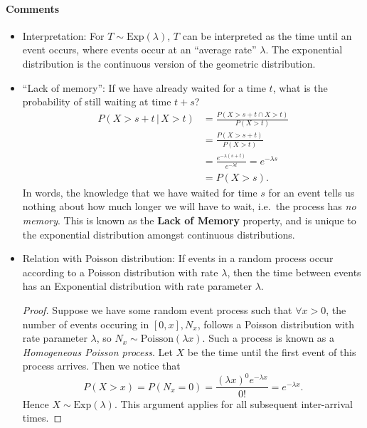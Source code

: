 \documentclass[12pt]{report}
\theoremstyle{definition}
\begin{document}
\paragraph{Comments}
\begin{itemize}
    \item Interpretation: For $T\sim\text{Exp}(\lambda)$, $T$ can be interpreted
        as the time until an event occurs, where events occur at an ``average
        rate'' $\lambda$.
        The exponential distribution is the continuous version of the geometric
        distribution.
    \item ``Lack of memory'': If we have already waited for a time $t$,
        what is the probability of still waiting at time $t+s$?
        \begin{align*}
            P(X>s+t\,|\,X>t)& =\frac{P(X>s+t\cap X>t)}{P(X>t)} \\
                            & =\frac{P(X>s+t)}{P(X>t)} \\
                            & =\frac{e^{-\lambda(s+t)}}{e^{-\lambda t}}
                            =e^{-\lambda s} \\
                            & =P(X>s).
        \end{align*} 
        In words, the knowledge that we have waited for time $s$ for an event
        tells us nothing about how much longer we will have to wait, i.e.\ the
        process has \emph{no memory}.
        This is known as the \textbf{Lack of Memory} property, and is unique to
        the exponential distribution amongst continuous distributions.
    \item Relation with Poisson distribution:
        If events in a random process occur according to a Poisson distribution
        with rate $\lambda$, then the time between events has an Exponential
        distribution with rate parameter $\lambda$.
        \begin{proof}
            Suppose we have some random event process such that $\forall x>0$,
            the number of events occuring in $[0,x],N_x$, follows a Poisson
            distribution with rate parameter $\lambda$, so
            $N_x\sim\text{Poisson}(\lambda x)$.
            Such a process is known as a \emph{Homogeneous Poisson process}.
            Let $X$ be the time until the first event of this process arrives.
            Then we notice that
            \[
                P(X>x)=P(N_x=0)=\frac{{(\lambda x)}^{0}e^{-\lambda x}}{0!}
                =e^{-\lambda x}.
            \]
            Hence $X\sim\text{Exp}(\lambda)$. This argument applies for all
            subsequent inter-arrival times.
        \end{proof} 
\end{itemize} 
\end{document}
